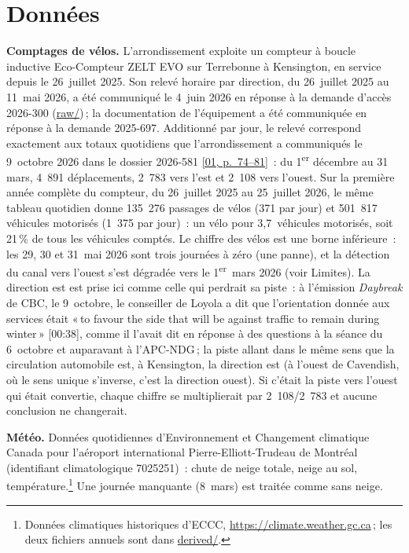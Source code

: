 \documentclass[11pt,letterpaper]{article}
\newcommand{\repourl}{https://github.com/OpenMobilityData/Terrebonne-access-requests}
\newcommand{\doc}[2]{\href{\repourl/blob/main/#1}{#2}}
\newcommand{\pagesurl}{https://openmobilitydata.github.io/Terrebonne-access-requests}
\newcommand{\pgl}[3]{\href{\pagesurl/\csname bundle#1\endcsname\#page=#2}{\textsf{\small[#1, p.~#3]}}}
\begin{document}
\section{Données}

\textbf{Comptages de vélos.} L'arrondissement exploite un compteur à
boucle inductive Eco-Compteur ZELT EVO sur Terrebonne à Kensington, en
service depuis le 26~juillet 2025. Son relevé horaire par direction, du
26~juillet 2025 au 11~mai 2026, a été communiqué le 4~juin 2026 en réponse
à la demande d'accès 2026-300 (\doc{2026-300/raw/}{raw/})\,; la
documentation de l'équipement a été communiquée en réponse à la demande
2025-697. Additionné par jour, le relevé correspond exactement aux totaux
quotidiens que l'arrondissement a communiqués le 9~octobre 2026 dans le
dossier 2026-581 \pgl{01}{74}{74--81}~: du 1\textsuperscript{er} décembre
au 31 mars, 4~891 déplacements, 2~783 vers l'est et 2~108 vers l'ouest. Sur
la première année complète du compteur, du 26~juillet 2025 au 25~juillet
2026, le même tableau quotidien donne 135~276 passages de vélos (371 par
jour) et 501~817 véhicules motorisés (1~375 par jour)~: un vélo pour
3,7~véhicules motorisés, soit 21\,\% de tous les véhicules comptés. Le
chiffre des vélos est une borne inférieure~: les 29, 30 et 31~mai 2026
sont trois journées à zéro (une panne), et la détection du canal vers
l'ouest s'est dégradée vers le 1\textsuperscript{er}~mars 2026 (voir
Limites). La
direction est est prise ici comme celle qui perdrait sa piste~: à
l'émission \emph{Daybreak} de CBC, le 9~octobre, le conseiller de Loyola a
dit que l'orientation donnée aux services était «\,to favour the side that
will be against traffic to remain during winter\,» [00:38], comme il l'avait
dit en réponse à des questions à la séance du 6~octobre et auparavant à
l'APC-NDG\,; la piste allant dans le même sens que la circulation
automobile est, à Kensington, la direction est (à l'ouest de Cavendish, où
le sens unique s'inverse, c'est la direction ouest). Si c'était la piste vers l'ouest qui était
convertie, chaque chiffre se multiplierait par 2~108/2~783 et aucune
conclusion ne changerait.

\textbf{Météo.} Données quotidiennes d'Environnement et Changement
climatique Canada pour l'aéroport international Pierre-Elliott-Trudeau de
Montréal (identifiant climatologique 7025251)~: chute de neige totale,
neige au sol, température.\footnote{Données climatiques historiques
d'ECCC, \url{https://climate.weather.gc.ca}\,; les deux fichiers annuels
sont dans \doc{2026-300/derived/}{derived/}.} Une journée manquante
(8~mars) est traitée comme sans neige.
\end{document}
